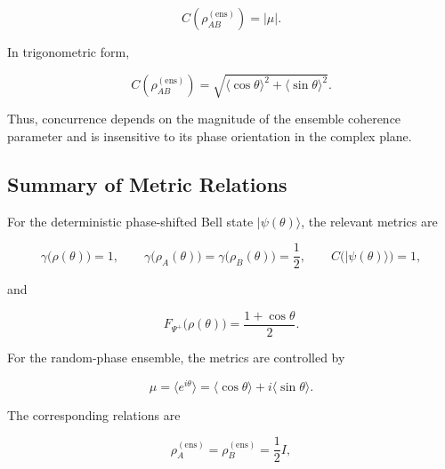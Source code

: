 \begin{equation}
C\left(\rho_{AB}^{(\mathrm{ens})}\right)
=
|\mu|.
\label{eq:d5_random_phase_ensemble_concurrence_mu}
\end{equation}

In trigonometric form,

\begin{equation}
C\left(\rho_{AB}^{(\mathrm{ens})}\right)
=
\sqrt{
\langle\cos\theta\rangle^2
+
\langle\sin\theta\rangle^2
}.
\label{eq:d5_random_phase_ensemble_concurrence_trigonometric}
\end{equation}

Thus, concurrence depends on the magnitude of the ensemble coherence parameter and is insensitive to its phase orientation in the complex plane.


\subsection{Summary of Metric Relations}

For the deterministic phase-shifted Bell state \( |\psi(\theta)\rangle \), the relevant metrics are

\begin{equation}
\gamma\big(\rho(\theta)\big)=1,
\qquad
\gamma\big(\rho_A(\theta)\big)=\gamma\big(\rho_B(\theta)\big)=\frac{1}{2},
\qquad
C\big(|\psi(\theta)\rangle\big)=1,
\label{eq:d5_deterministic_phase_metric_summary_first}
\end{equation}

and

\begin{equation}
F_{\Psi^+}\big(\rho(\theta)\big)
=
\frac{1+\cos\theta}{2}.
\label{eq:d5_deterministic_phase_metric_summary_second}
\end{equation}

For the random-phase ensemble, the metrics are controlled by

\begin{equation}
\mu
=
\langle e^{i\theta}\rangle
=
\langle\cos\theta\rangle+i\langle\sin\theta\rangle.
\label{eq:d5_metric_summary_mu}
\end{equation}

The corresponding relations are

\begin{equation}
\rho_A^{(\mathrm{ens})}
=
\rho_B^{(\mathrm{ens})}
=
\frac{1}{2}I,
\label{eq:d5_metric_summary_reduced_states}
\end{equation}


